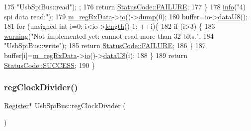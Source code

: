 \begin{DoxyCode}
175         \textcolor{stringliteral}{"UsbSpiBus::read"});  ;
176     \textcolor{keywordflow}{return} \hyperlink{classStatusCode_a6f565cbeadc76d14c72f047e5e85eb4ba3da73d4c469762eb9d3c960368252b26}{StatusCode::FAILURE};
177   \}
178   \hyperlink{classObject_a644fd329ea4cb85f54fa6846484b84a8}{info}(\textcolor{stringliteral}{"4) spi data read:"});
179   \hyperlink{classUsbSpiBus_ab59fb8ae67f97818d8cc6e0daf324cf6}{m\_regRxData}->\hyperlink{classIOobject_af04fb94137c3d86849f478ac5afab5d1}{io}()->\hyperlink{classIOdata_a208e24222bf2044a4ff8bbb1a6bdc13b}{dump}(0);
180   buffer=io->\hyperlink{classIOdata_a75e9c318dbac3a39402179070943d4bc}{dataU8}();
181   \textcolor{keywordflow}{for} (\textcolor{keywordtype}{unsigned} \textcolor{keywordtype}{int} i=0; i<io->\hyperlink{classIOdata_abb40e71ce0290832a24857b4a1e7b1a3}{length}()-1; ++i)\{
182     \textcolor{keywordflow}{if} (i>3) \{
183       \hyperlink{classObject_a65cd4fda577711660821fd2cd5a3b4c9}{warning}(\textcolor{stringliteral}{"Not implemented yet: cannot read more than 32 bits."},
184           \textcolor{stringliteral}{"UsbSpiBus::write"});
185       \textcolor{keywordflow}{return} \hyperlink{classStatusCode_a6f565cbeadc76d14c72f047e5e85eb4ba3da73d4c469762eb9d3c960368252b26}{StatusCode::FAILURE};
186     \}
187     buffer[i]=\hyperlink{classUsbSpiBus_ab59fb8ae67f97818d8cc6e0daf324cf6}{m\_regRxData}->\hyperlink{classIOobject_af04fb94137c3d86849f478ac5afab5d1}{io}()->\hyperlink{classIOdata_a75e9c318dbac3a39402179070943d4bc}{dataU8}(i);    
188   \}
189   \textcolor{keywordflow}{return} \hyperlink{classStatusCode_a6f565cbeadc76d14c72f047e5e85eb4badd0da38d3ba0d922efd1f4619bc37ad8}{StatusCode::SUCCESS};
190 \}
\end{DoxyCode}
\mbox{\label{classUsbSpiBus_a338edc7bdac1abd1998890bb1aa0509a}} 
\subsubsection{\texorpdfstring{reg\+Clock\+Divider()}{regClockDivider()}}
{\footnotesize\ttfamily \hyperlink{classRegister}{Register}$\ast$ Usb\+Spi\+Bus\+::reg\+Clock\+Divider (\begin{DoxyParamCaption}{ }\end{DoxyParamCaption})\hspace{0.3cm}{\ttfamily [inline]}}



